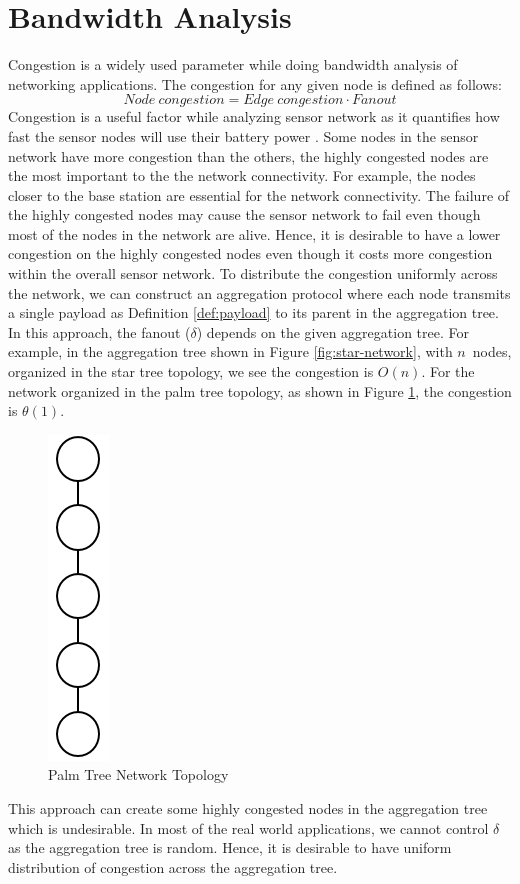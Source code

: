 \section{Bandwidth Analysis}
	Congestion is a widely used parameter while doing bandwidth analysis of networking applications.
	The congestion for any given node is defined as follows:
	\begin{equation}\label{def:congestion}
		Node\ congestion = Edge\ congestion \cdot Fanout
	\end{equation}
	Congestion is a useful factor while analyzing sensor network as it quantifies how fast the sensor nodes will use their battery power \cite{madden2003design}. 
	Some nodes in the sensor network have more congestion than the others, the highly congested nodes are the most important to the the network connectivity.
	For example, the nodes closer to the base station are essential for the network connectivity.
	The failure of the highly congested nodes may cause the sensor network to fail even though most of the nodes in the network are alive.
	Hence, it is desirable to have a lower congestion on the highly congested nodes even though it costs more congestion within the overall sensor network.
	To distribute the congestion uniformly across the network, we can construct an aggregation protocol where each node transmits a single payload as Definition \ref{def:payload} to its parent in the aggregation tree.
	In this approach, the fanout ($\delta$) depends on the given aggregation tree.
	For example, in the aggregation tree shown in Figure \ref{fig:star-network}, with $n$\ nodes, organized in the star tree topology, we see the congestion is $O(n)$.
	For the network organized in the palm tree topology, as shown in Figure \ref{fig:palm-tree-network}, the congestion is $\theta(1)$.
	\begin{figure}[h!]
		\centering
		\includegraphics[scale = 1]{images/palm-tree.png}
		\caption{Palm Tree Network Topology}
		\label{fig:palm-tree-network}
	\end{figure}
	This approach can create some highly congested nodes in the aggregation tree which is undesirable.
	In most of the real world applications, we cannot control $\delta$ as the aggregation tree is random.
	Hence, it is desirable to have uniform distribution of congestion across the aggregation tree.

